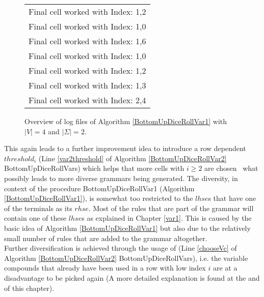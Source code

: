 \begin{figure}[h]
	\centering
		\begin{tabular}{l}
			Final cell worked with Index: 1,2\\
			Final cell worked with Index: 1,0\\
			Final cell worked with Index: 1,6 \\
			Final cell worked with Index: 1,0\\
			Final cell worked with Index: 1,2\\
			Final cell worked with Index: 1,3\\
			Final cell worked with Index: 2,4\\
	\end{tabular}
	\caption{Overview of log files of Algorithm \ref{BottomUpDiceRollVar1} with $|V|=4$ and $|\Sigma|=2$.}
	\label{logsVar1}
\end{figure}
\noindent This again leads to a further improvement idea to introduce a row dependent $threshold_i$ (Line \ref{var2threshold} of Algorithm \ref{BottomUpDiceRollVar2} BottomUpDiceRollVars) which helps that more cells with $i\geq2$ are chosen \textendash~what possibly leads to more diverse grammars being generated. The diversity, in context of the procedure BottomUpDiceRollVar1 (Algorithm \ref{BottomUpDiceRollVar1}), is somewhat too restricted to the $lhse$s that have one of the terminals as its $rhse$. Most of the rules that are part of the grammar will contain one of these $lhse$s as explained in Chapter \ref{var1}. This is caused by the basic idea of Algorithm \ref{BottomUpDiceRollVar1} but also due to the relatively small number of rules that are added to the grammar altogether. \\
Further diversification is achieved through the usage of  (Line \ref{chooseVc} of Algorithm \ref{BottomUpDiceRollVar2} BottomUpDiceRollVars), i.e. the variable compounds that already have been used in a row with low index $i$ are at a disadvantage to be picked again (A more detailed explanation is found at the and of this chapter).\\

